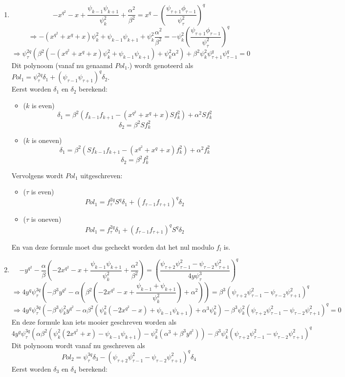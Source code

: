 \documentclass[10pt]{article}
\begin{document}
\begin{enumerate}
\item $$-x^{q^2}-x+\frac{\psi_{k-1}\psi_{k+1}}{\psi_k^2}+\frac{\alpha^2}{\beta^2}=x^q-(\frac{\psi_{\tau+1}\phi_{\tau-1}}{\psi_\tau^2})^q$$
$$ \Rightarrow -(x^{q^2}+x^q+x)\psi_k^2+\psi_{k-1}\psi_{k+1}+\psi_k^2\frac{\alpha^2}{\beta^2}=-\psi_k^2(\frac{\psi_{\tau+1}\phi_{\tau-1}}{\psi_\tau^2})^q$$
$$ \Rightarrow \psi_\tau^{2q}(\beta^2(-(x^{q^2}+x^q+x)\psi_k^2+\psi_{k-1}\psi_{k+1})+\psi_k^2\alpha^2)+\beta^2\psi_k^2\psi_{\tau+1}^q\psi_{\tau-1}^q=0  $$
Dit polynoom (vanaf nu genaamd $Pol_1$.) wordt genoteerd als $Pol_1=\psi_\tau^{2q}\delta_1+(\psi_{\tau-1}\psi_{\tau+1})^q \delta_2$.\\

Eerst worden $\delta_1$ en $\delta_2$ berekend:
\begin{itemize}
\item ($k$ is even) $$\delta_1=\beta^2(f_{k-1}f_{k+1}-(x^{q^2}+x^q+x)Sf_k^2)+\alpha^2Sf_k^2$$
$$\delta_2=\beta^2Sf_k^2$$
\item ($k$ is oneven) $$\delta_1=\beta^2(Sf_{k-1}f_{k+1}-(x^{q^2}+x^q+x)f_k^2)+\alpha^2f_k^2$$
$$ \delta_2=\beta^2f_k^2$$
\end{itemize}

Vervolgens wordt $Pol_1$ uitgeschreven:
\begin{itemize}
\item ($\tau$ is even) $$Pol_1=f_\tau^{2q}S^q\delta_1+(f_{\tau-1}f_{\tau+1})^q\delta_2$$
\item ($\tau$ is oneven) $$Pol_1=f_\tau^{2q}\delta_1+(f_{\tau-1}f_{\tau+1})^qS^q\delta_2$$
\end{itemize}

En van deze formule moet dus gecheckt worden dat het nul modulo $f_l$ is.
\item $$-y^{q^2}-\frac{\alpha}{\beta}(-2x^{q^2}-x+\frac{\psi_{k-1}\psi_{k+1}}{\psi_k^2}+\frac{\alpha^2}{\beta^2})=(\frac{\psi_{\tau+2}\psi_{\tau-1}^2-\psi_{\tau-2}\psi_{\tau+1}^2}{4y\psi_\tau^3})^q$$
$$\Rightarrow 4y^q\psi_\tau^{3q}(-\beta^3y^{q^2}-\alpha(\beta^2(-2x^{q^2}-x+\frac{\psi_{k-1}+\psi_{k+1}}{\psi_k^2})+\alpha^2))=\beta^3(\psi_{\tau+2}\psi_{\tau-1}^2-\psi_{\tau-2}\psi_{\tau+1}^2)^q$$
$$\Rightarrow 4y^q\psi_\tau^{3q}(-\beta^3\psi_k^2y^{q^2}-\alpha\beta^2(\psi_k^2(-2x^{q^2}-x)+\psi_{k-1}\psi_{k+1})+\alpha^3\psi_k^2)-\beta^3\psi_k^2(\psi_{\tau+2}\psi_{\tau-1}^2-\psi_{\tau-2}\psi_{\tau+1}^2)^q=0$$
En deze formule kan iets mooier geschreven worden als
$$ 4y^q\psi_\tau^{3q}(\alpha\beta^2(\psi_k^2(2x^{q^2}+x)-\psi_{k-1}\psi_{k+1})-\psi_k^2(\alpha^3+\beta^3y^{q^2}))-\beta^3\psi_k^2(\psi_{\tau+2}\psi_{\tau-1}^2-\psi_{\tau-2}\psi_{\tau+1}^2)^q $$
Dit polynoom wordt vanaf nu geschreven als $$Pol_2=\psi_\tau^{3q}\delta_3-(\psi_{\tau+2}\psi_{\tau-1}^2-\psi_{\tau-2}\psi_{\tau+1}^2)^q\delta_4$$
Eerst worden $\delta_3$ en $\delta_4$ berekend:


\end{enumerate}
\end{document}
